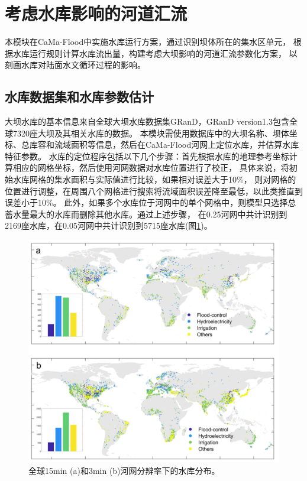 \section{考虑水库影响的河道汇流}
    本模块在CaMa-Flood中实施水库运行方案，通过识别坝体所在的集水区单元，
    根据水库运行规则计算水库流出量，构建考虑大坝影响的河道汇流参数化方案，
    以刻画水库对陆面水文循环过程的影响。
\subsection{水库数据集和水库参数估计}\label{水库数据集和水库参数估计}
大坝水库的基本信息来自全球大坝水库数据集GRanD\citep{lehner2011high}，GRanD version1.3包含全球7320座大坝及其相关水库的数据。
本模块需使用数据库中的大坝名称、坝体坐标、总库容和流域面积等信息，然后在CaMa-Flood河网上定位水库，并估算水库特征参数。
水库的定位程序包括以下几个步骤：首先根据水库的地理参考坐标计算相应的网格坐标，然后使用河网数据对水库位置进行了校正，
具体来说，将初始水库网格的集水面积与实际值进行比较，如果相对误差大于10\%，
则对网格的位置进行调整，在周围八个网格进行搜索将流域面积误差降至最低，以此类推直到误差小于10\%。
此外，如果多个水库位于河网中的单个网格中，则模型只选择总蓄水量最大的水库而删除其他水库。通过上述步骤，
在0.25\textdegree 河网中共计识别到2169座水库，在0.05\textdegree 河网中共计识别到5715座水库(图\ref{fig:水库分布})。

{
\begin{figure}[]
\centering
\includegraphics{Figures/陆地表面的水分循环/水库分布.png}
\caption{全球15min (a)和3min (b)河网分辨率下的水库分布。}
\label{fig:水库分布}
\end{figure}
}

